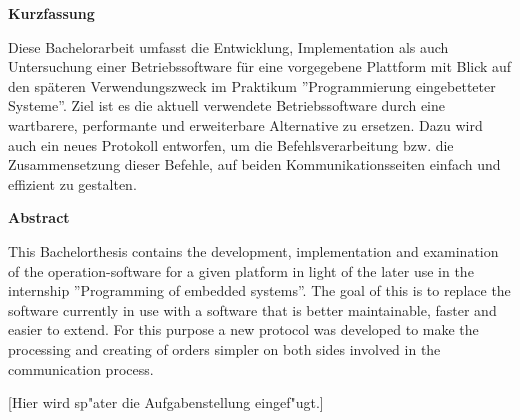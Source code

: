 \documentclass[11pt,twoside]{scrbook}
\begin{document}

\centerline{\bf Kurzfassung}

Diese Bachelorarbeit umfasst die Entwicklung, Implementation als auch Untersuchung einer
Betriebssoftware für eine vorgegebene Plattform mit Blick auf den späteren Verwendungszweck
im Praktikum ''Programmierung eingebetteter Systeme''. Ziel ist es die aktuell verwendete
Betriebssoftware durch eine wartbarere, performante und erweiterbare Alternative zu
ersetzen. Dazu wird auch ein neues Protokoll entworfen, um die Befehlsverarbeitung bzw.
die Zusammensetzung dieser Befehle, auf beiden Kommunikationsseiten einfach und effizient
zu gestalten.

%
\vskip 3cm
%

\centerline{\bf Abstract}

This Bachelorthesis contains the development, implementation and examination of the
operation-software for a given platform in light of the later use in the internship
''Programming of embedded systems''. The goal of this is to replace the software
currently in use with a software that is better maintainable, faster and easier to
extend. For this purpose a new protocol was developed to make the processing and
creating of orders simpler on both sides involved in the communication process.

\cleardoublepage

\vspace*{7cm}
\centerline{[Hier wird sp"ater die Aufgabenstellung eingef"ugt.]}




\tableofcontents		%
\cleardoublepage
\listoffigures			%
\cleardoublepage
\listoftables			%
\cleardoublepage



\setcounter{page}{0}

\pagestyle{headings}



\cleardoublepage


\cleardoublepage


\cleardoublepage


\cleardoublepage


\cleardoublepage


\cleardoublepage


\cleardoublepage



\cleardoublepage

\begin{appendix}

\cleardoublepage

\end{appendix}
\end{document}
